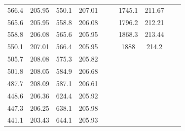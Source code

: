 \begin{center}
\begin{tabular}{|cccc||cccc||cc|}
    566.4    & 205.95                   & 550.1 & 207.01                        &       &                                     & 1745.1 & 211.67                                &          &                                     \\
    565.6    & 205.95                   & 558.8 & 206.08                        &       &                                     & 1796.2 & 212.21                                &          &                                     \\
    558.8    & 206.08                   & 565.6 & 205.95                        &       &                                     & 1868.3 & 213.44                                &          &                                     \\
    550.1    & 207.01                   & 566.4 & 205.95                        &       &                                     & 1888   & 214.2                                 &          &                                     \\
    505.7    & 208.08                   & 575.3 & 205.82                        &       &                                     &        &                                       &          &                                     \\
    501.8    & 208.05                   & 584.9 & 206.68                        &       &                                     &        &                                       &          &                                     \\
    487.7    & 208.09                   & 587.1 & 206.61                        &       &                                     &        &                                       &          &                                     \\
    448.6    & 206.36                   & 624.4 & 205.92                        &       &                                     &        &                                       &          &                                     \\
    447.3    & 206.25                   & 638.1 & 205.98                        &       &                                     &        &                                       &          &                                     \\
    441.1    & 203.43                   & 644.1 & 205.93                        &       &                                     &        &                                       &          &                                     \\

\end{tabular}
\end{center}
